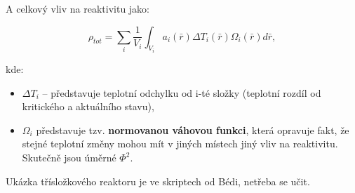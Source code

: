 A celkový vliv na reaktivitu jako:

\begin{equation}
  \boxed{
  \rho_{tot} = \sum_i \dfrac{1}{V_i} \int_{V_i} a_i(\bar{r}) \Delta T_i(\bar{r}) \Omega_i(\bar{r}) d\bar{r},
  \label{zpetnovazebni_koeficient_reaktivita}
  }
\end{equation}

kde:

\begin{itemize}
  \item $\Delta T_i$ -- představuje teplotní odchylku od i-té složky (teplotní rozdíl od kritického a aktuálního stavu),
  \item $\Omega_i$ představuje tzv. \textbf{normovanou váhovou funkci}, která opravuje fakt, že stejné teplotní změny mohou mít v jiných místech jiný vliv na reaktivitu. Skutečně jsou úměrné $\Phi^2$.
\end{itemize}

Ukázka třísložkového reaktoru je ve skriptech od Bédi, netřeba se učit. 
